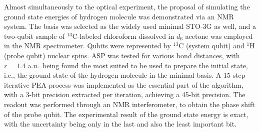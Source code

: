 \documentclass[8.5pt,twoside,twocolumn]{article}
\begin{document}
Almost simultaneously to the optical experiment, the proposal of
simulating the ground state energies of hydrogen molecule was
demonstrated via an NMR system.\cite{NMR_static}
The basis was selected as the widely used minimal STO-3G as well,
and a two-qubit sample of $^{13}$C-labeled chloroform dissolved
in $d_6$ acetone was employed in the NMR spectrometer.
Qubits were represented by $^{13}$C (system qubit) and
$^{1}$H (probe qubit)
nuclear spins. ASP \cite{factoring} was tested for various bond
distances, with $r=1.4$ a.u.\ being found the most suited to be used to
prepare the initial state,
i.e., the ground state of the hydrogen molecule in the minimal basis.
A 15-step iterative PEA process was implemented as the essential part of
the algorithm, with a 3-bit precision extracted per iteration,
achieving a 45-bit precision. The readout was performed
through an NMR interferometer,\cite{inter1,inter2,inter3} to obtain
the phase shift of the probe qubit.
The experimental result of the ground state energy is exact,
with the uncertainty being only in the last and also the least
important bit.
\end{document}
